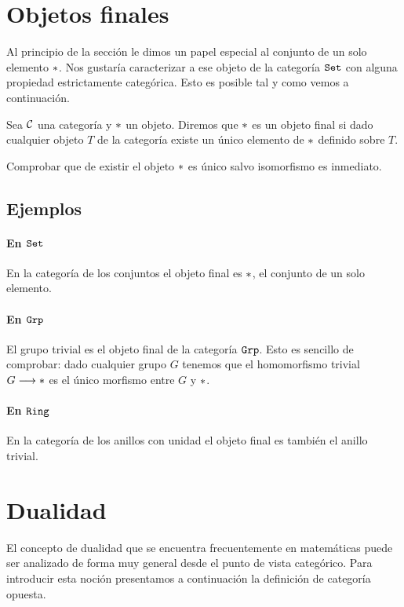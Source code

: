 \section{Objetos finales}
Al principio de la sección le dimos un papel especial al conjunto
de un solo elemento $*$. Nos gustaría caracterizar a ese objeto de
la categoría $\texttt{Set}$ con alguna propiedad estrictamente categórica.
Esto es posible tal y como vemos a continuación.

\begin{definition}
Sea $\mathcal{C}$ una categoría y $*$ un objeto. Diremos que $*$ es un objeto
final si dado cualquier objeto $T$ de la categoría existe un
único elemento de $*$ definido sobre $T$.
\end{definition}

Comprobar que de existir el objeto $*$ es único salvo isomorfismo
es inmediato.
\subsection{Ejemplos}
\paragraph{En $\texttt{Set}$}
En la categoría de los conjuntos el objeto final es $*$,
el conjunto de un solo elemento.

\paragraph{En $\texttt{Grp}$}
El grupo trivial es el objeto final de la categoría $\texttt{Grp}$.
Esto es sencillo de comprobar: dado cualquier grupo $G$ tenemos
que el homomorfismo trivial $G\longrightarrow *$ es el único morfismo
entre $G$ y $*$.

\paragraph{En $\texttt{Ring}$}
En la categoría de los anillos con unidad el objeto final es
también el anillo trivial.

\section{Dualidad}
El concepto de dualidad que se encuentra frecuentemente en
matemáticas puede ser analizado de forma muy general desde el punto
de vista categórico. Para introducir esta noción presentamos a
continuación la definición de categoría opuesta.

